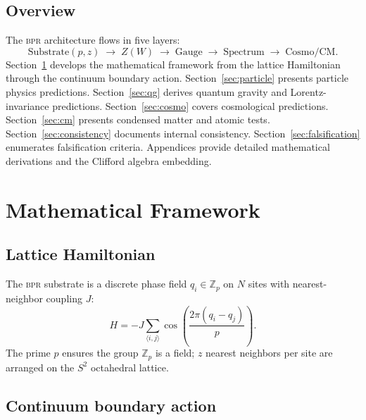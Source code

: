 \documentclass[aps,prd,twocolumn,superscriptaddress,longbibliography,nofootinbib]{revtex4-2}
\newcommand{\Zp}{\mathbb{Z}_p}
\newcommand{\Stwo}{S^2}
\newcommand{\Zimp}{Z}
\newcommand{\bpr}{\textsc{bpr}}
\begin{document}
\subsection{Overview}

The \bpr{} architecture flows in five layers:
\begin{equation}
\text{Substrate}(p,z) \;\to\; \Zimp(W) \;\to\;
\text{Gauge} \;\to\; \text{Spectrum} \;\to\;
\text{Cosmo/CM}.
\label{eq:architecture}
\end{equation}
Section~\ref{sec:framework} develops the mathematical framework from the
lattice Hamiltonian through the continuum boundary action.
Section~\ref{sec:particle} presents particle physics predictions.
Section~\ref{sec:qg} derives quantum gravity and Lorentz-invariance
predictions.
Section~\ref{sec:cosmo} covers cosmological predictions.
Section~\ref{sec:cm} presents condensed matter and atomic tests.
Section~\ref{sec:consistency} documents internal consistency.
Section~\ref{sec:falsification} enumerates falsification criteria.
Appendices provide detailed mathematical derivations and the
Clifford algebra embedding.


\section{Mathematical Framework}
\label{sec:framework}

\subsection{Lattice Hamiltonian}

The \bpr{} substrate is a discrete phase field $q_i \in \Zp$ on $N$ sites
with nearest-neighbor coupling $J$:
\begin{equation}
H = -J \sum_{\langle i,j\rangle}
  \cos\!\left(\frac{2\pi(q_i - q_j)}{p}\right).
\label{eq:H}
\end{equation}
The prime $p$ ensures the group $\Zp$ is a field; $z$ nearest neighbors per
site are arranged on the $\Stwo$ octahedral lattice.

\subsection{Continuum boundary action}
\end{document}
